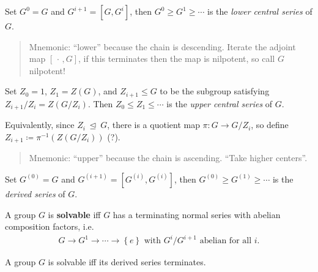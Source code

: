 \begin{definition}

Set \(G^0 = G\) and \(G^{i+1} = [G, G^i]\), then
\(G^0 \geq G^1 \geq \cdots\) is the \emph{lower central series} of
\(G\).

\end{definition}

\begin{quote}
Mnemonic: ``lower'' because the chain is descending. Iterate the adjoint
map \([{\,\cdot\,}, G]\), if this terminates then the map is nilpotent,
so call \(G\) nilpotent!
\end{quote}

\begin{definition}

Set \(Z_0 = 1\), \(Z_1 = Z(G)\), and \(Z_{i+1} \leq G\) to be the
subgroup satisfying \(Z_{i+1}/Z_i = Z(G/Z_i)\). Then
\(Z_0 \leq Z_1 \leq \cdots\) is the \emph{upper central series} of
\(G\).

Equivalently, since \(Z_i{~\trianglelefteq~}G\), there is a quotient map
\(\pi:G\to G/Z_i\), so define \(Z_{i+1} \coloneqq\pi^{-1}(Z(G/Z_i))\)
(?).

\begin{quote}
Mnemonic: ``upper'' because the chain is ascending. ``Take higher
centers''.
\end{quote}

\end{definition}

\begin{definition}

Set \(G^{(0)} = G\) and \(G^{(i+1)} = [G^{(i)}, G^{(i)}]\), then
\(G^{(0)} \geq G^{(1)} \geq \cdots\) is the \emph{derived series} of
\(G\).

\end{definition}

\begin{definition}[Solvable]

A group \(G\) is \textbf{solvable} iff \(G\) has a terminating normal
series with abelian composition factors, i.e.
\begin{align*}
G \to G^1 \to \cdots \to \left\{{e}\right\} \text{ with } G^{i}/G^{i+1}\text{ abelian for all } i
.\end{align*}

\end{definition}

\begin{theorem}

A group \(G\) is solvable iff its derived series terminates.

\end{theorem}

